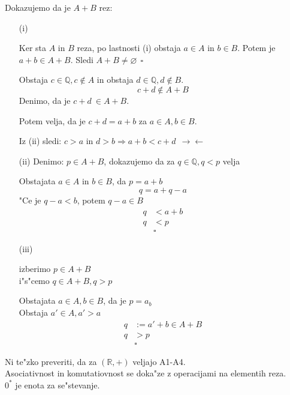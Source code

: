 Dokazujemo da je \(A + B\) rez:
\begin{enumerate}
	\item[(i)] 
	
	Ker sta \(A\) in \(B\) reza, po lastnosti (i) obstaja \(a \in A\) in \(b \in B\). Potem je \(a + b \in A + B\). Sledi \(A + B \neq \varnothing \ \ \square\)
	
	
	Obstaja \(c \in \mathbb{Q}, c \notin A\) in obstaja \(d \in \mathbb{Q}, d \notin B\).
	\[c + d \notin A + B\]
	Denimo, da je \(c + d\ \in A + B\).
	
	Potem velja, da je \(c + d = a + b\) za \(a \in A, b \in B\).
	
	Iz (ii) sledi: \(c > a\) in \(d > b \Rightarrow a + b < c + d \ \ \rightarrow\leftarrow\)
	
	\item[(ii)] Denimo: \(p \in A + B\), dokazujemo da za \(q \in \mathbb{Q}, q < p\) velja 
	
	Obstajata \(a \in A\) in \(b \in B\), da \(p = a + b\)
	\[q = a + q - a\]
	"Ce je \(q - a < b\), potem \(q - a \in B\)
	\begin{align*}
		q &< a + b\\
		q &< p\\
		&\square
	\end{align*}

	\item[(iii)] 
	
	izberimo \(p \in A + B\)\\
	i"s"cemo \(q \in A + B, q > p\)
	
	Obstajata \(a \in A, b \in B\), da je \(p = a _ b\)\\
	Obstaja \(a' \in A, a' > a\)
	\begin{align*}
		q &:= a' + b \in A + B\\
		q &> p\\
		&\square
	\end{align*}
\end{enumerate}

Ni te"zko preveriti, da za \((\mathbb{R}, +)\) veljajo A1-A4.\\
\hspace*{12pt}Asociativnost in komutatiovnost se doka"ze z operacijami na elementih reza.\\
\hspace*{12pt}\(0^*\) je enota za se"stevanje.

